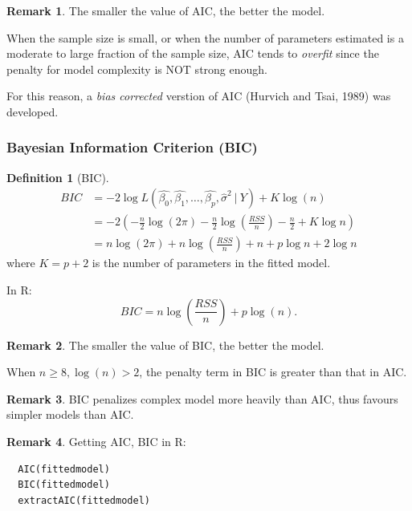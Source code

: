 \documentclass[11pt]{article}
\theoremstyle{definition}
\newtheorem{definition}{Definition}[section]
\newtheorem{remark}{Remark}[section]
\numberwithin{equation}{section}
\begin{document}
\begin{remark}
  The smaller the value of AIC, the better the model.
\end{remark}

When the sample size is small, or when the number of parameters estimated is a moderate to large fraction of the sample size, AIC tends to \textit{overfit} since the penalty for model complexity is NOT strong enough.

\begin{writenotes}
  For this reason, a \textit{bias corrected} verstion of AIC (Hurvich and Tsai, 1989) was developed.
\end{writenotes}

\subsubsection{Bayesian Information Criterion (BIC)}

\begin{definition}[BIC]
  \begin{align}
    BIC &= -2\log L(\hat{\beta_0},\hat{\beta_1},\dots,\hat{\beta_p},\hat{\sigma}^2\> | \> Y) + K\log(n)\\
    &= -2\left( -\frac{n}{2} \log(2\pi) - \frac{n}{2}\log\left(\frac{RSS}{n}\right) - \frac{n}{2} + K\log n \right)\\
    &= n\log(2\pi) + n\log\left(\frac{RSS}{n}\right) + n + p\log n + 2\log n
  \end{align}
  where $K = p + 2$ is the number of parameters in the fitted model.
\end{definition}
\begin{writenotes}
  In R:
  \begin{equation}
    BIC = n\log\left( \frac{RSS}{n} \right) + p\log(n).
  \end{equation}
\end{writenotes}

\begin{remark}
  The smaller the value of BIC, the better the model.
\end{remark}

When $n\geq 8,\log(n) > 2$, the penalty term in BIC is greater than that in AIC.

\begin{remark}
  BIC penalizes complex model more heavily than AIC, thus favours simpler models than AIC.
\end{remark}

\begin{remark}
Getting AIC, BIC in R:
\begin{verbatim}
  AIC(fittedmodel)
  BIC(fittedmodel)
  extractAIC(fittedmodel)
\end{verbatim}
\end{remark}
\end{document}
